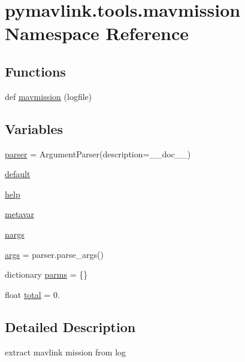 \hypertarget{namespacepymavlink_1_1tools_1_1mavmission}{}\section{pymavlink.\+tools.\+mavmission Namespace Reference}
\label{namespacepymavlink_1_1tools_1_1mavmission}
\subsection*{Functions}
\begin{DoxyCompactItemize}
\item 
def \mbox{\hyperlink{namespacepymavlink_1_1tools_1_1mavmission_a3c88671acc1dd08329c20a3b3e104678}{mavmission}} (logfile)
\end{DoxyCompactItemize}
\subsection*{Variables}
\begin{DoxyCompactItemize}
\item 
\mbox{\hyperlink{namespacepymavlink_1_1tools_1_1mavmission_a783e72af1a8db42185949445362b3247}{parser}} = Argument\+Parser(description=\+\_\+\+\_\+doc\+\_\+\+\_\+)
\item 
\mbox{\hyperlink{namespacepymavlink_1_1tools_1_1mavmission_a64691dc2e3eee904c09f166b3465d7d0}{default}}
\item 
\mbox{\hyperlink{namespacepymavlink_1_1tools_1_1mavmission_af9b043f4f23b7216f0e777cd858eaacd}{help}}
\item 
\mbox{\hyperlink{namespacepymavlink_1_1tools_1_1mavmission_a41bcbee85f5db6d41734d2e919a91b0c}{metavar}}
\item 
\mbox{\hyperlink{namespacepymavlink_1_1tools_1_1mavmission_ac1d4e5b9176ca26036ee48cec931b152}{nargs}}
\item 
\mbox{\hyperlink{namespacepymavlink_1_1tools_1_1mavmission_a4d9e4820244de01495a91d4862f575d8}{args}} = parser.\+parse\+\_\+args()
\item 
dictionary \mbox{\hyperlink{namespacepymavlink_1_1tools_1_1mavmission_afb7a34f4e9ed1197f99f36f8ece8a1d6}{parms}} = \{\}
\item 
float \mbox{\hyperlink{namespacepymavlink_1_1tools_1_1mavmission_aa714e94d66d6efe561bc39e094364733}{total}} = 0.
\end{DoxyCompactItemize}


\subsection{Detailed Description}
\begin{DoxyVerb}extract mavlink mission from log
\end{DoxyVerb}
 

